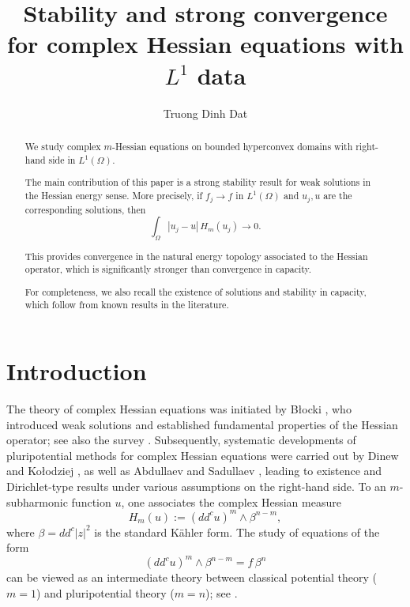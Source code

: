 \documentclass[11pt,reqno]{amsart}
\title{Stability and strong convergence for complex Hessian equations with $L^1$ data}
\author{Truong Dinh Dat}
\theoremstyle{definition}
\theoremstyle{remark}
\newcommand{\ddc}{dd^c}
\begin{document}
	
\begin{abstract}
	We study complex $m$-Hessian equations on bounded hyperconvex domains
	with right-hand side in $L^1(\Omega)$.
	
	The main contribution of this paper is a strong stability result
	for weak solutions in the Hessian energy sense.
	More precisely, if $f_j \to f$ in $L^1(\Omega)$ and $u_j, u$
	are the corresponding solutions, then
	\[
	\int_\Omega |u_j-u|\, H_m(u_j) \longrightarrow 0.
	\]
	
	This provides convergence in the natural energy topology
	associated to the Hessian operator, which is significantly
	stronger than convergence in capacity.
	
	For completeness, we also recall the existence of solutions
	and stability in capacity, which follow from known results
	in the literature.
\end{abstract}
	
	
	
	\maketitle
	
	\section{Introduction}
	The theory of complex Hessian equations was initiated by Błocki \cite{Blocki2005},
	who introduced weak solutions and established fundamental properties of the Hessian operator;
	see also the survey \cite{Blocki2013}.
	Subsequently, systematic developments of pluripotential methods for complex Hessian equations
	were carried out by Dinew and Ko{\l}odziej \cite{DinewKolodziej2014,Dinew2011,Blocki2005},
	as well as Abdullaev and Sadullaev \cite{AbdullaevSadullaev2014},
	leading to existence and Dirichlet-type results under various assumptions
	 on the right-hand side. To an $m$-subharmonic function $u$, one associates the complex Hessian measure
	\[
	H_m(u) := (\ddc u)^m \wedge \beta^{n-m},
	\]
	where $\beta = \ddc |z|^2$ is the standard K\"ahler form.
	The study of equations of the form
	\begin{equation}\label{eq:main}
		(\ddc u)^m \wedge \beta^{n-m} = f \, \beta^n
	\end{equation}
	can be viewed as an intermediate theory between classical potential theory ($m=1$) and pluripotential theory ($m=n$); see \cite{Blocki2005,Lu2013}.
	
\end{document}
